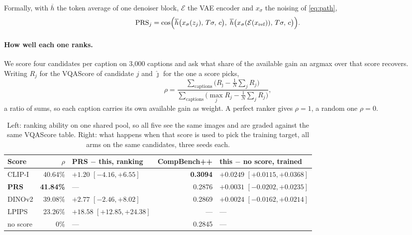 \documentclass[11pt]{article}
\newcommand{\obs}[1]{\textcolor{obsblue}{#1}}
\newcommand{\bad}[1]{\textcolor{badred}{#1}}
\begin{document}
Formally, with $\overline{h}$ the token average of one denoiser block, $\mathcal E$ the VAE encoder
and $x_\sigma$ the noising of \cref{eq:path},
\begin{equation}
  \mathrm{PRS}_j = \cos\Bigl(\overline{h}\bigl(x_\sigma(z_j),\,T\sigma,\,c\bigr),\;
  \overline{h}\bigl(x_\sigma(\mathcal E(x_{\text{ref}})),\,T\sigma,\,c\bigr)\Bigr).
\label{eq:prs}
\end{equation}

\paragraph{How well each one ranks.}
We score four candidates per caption on \obs{3{,}000} captions and ask what share of the available
gain an argmax over that score recovers. Writing $R_j$ for the VQAScore of candidate $j$ and
$\hat\jmath$ for the one a score picks,
\begin{equation}
  \rho=\frac{\sum_{\text{captions}}\bigl(R_{\hat\jmath}-\tfrac1N\sum_j R_j\bigr)}
            {\sum_{\text{captions}}\bigl(\max_j R_j-\tfrac1N\sum_j R_j\bigr)} ,
\label{eq:rho}
\end{equation}
a ratio of sums, so each caption carries its own available gain as weight. A perfect ranker gives
$\rho=1$, a random one $\rho=0$.

\begin{table}[h]
\centering
\caption{Left: ranking ability on one shared pool, so all five see the same images and are graded
against the same VQAScore table. Right: what happens when that score is used to pick the training
target, all arms on the same candidates, three seeds each.}
\label{tab:rankers}
\small
\begin{tabular}{@{}lrlrl@{}}
\toprule
Score & $\rho$ & PRS $-$ this, ranking & CompBench++ & this $-$ no score, trained \\
\midrule
CLIP-I & \obs{40.64\%} & \bad{$+1.20$ $[-4.16,+6.55]$} & \obs{\textbf{0.3094}} & \obs{$+0.0249$ $[+0.0115,+0.0368]$} \\
\textbf{PRS} & \obs{\textbf{41.84\%}} & --- & \obs{0.2876} & \bad{$+0.0031$ $[-0.0202,+0.0235]$} \\
DINOv2 & \obs{39.08\%} & \bad{$+2.77$ $[-2.46,+8.02]$} & \obs{0.2869} & \bad{$+0.0024$ $[-0.0162,+0.0214]$} \\
LPIPS & \obs{23.26\%} & \obs{$+18.58$ $[+12.85,+24.38]$} & --- & --- \\
no score & \obs{0\%} & --- & \obs{0.2845} & --- \\
\bottomrule
\end{tabular}
\end{table}
\end{document}
